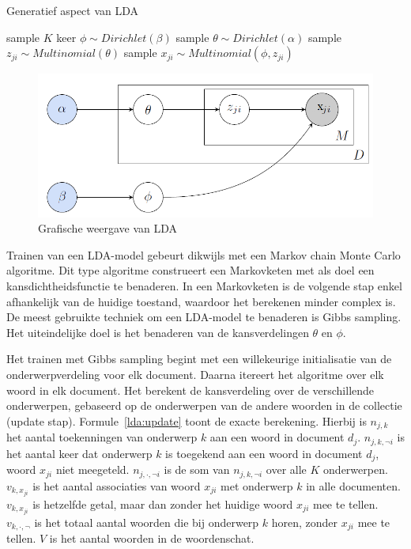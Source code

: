 \begin{algorithm}
\caption{Generatief aspect van LDA}
\begin{algorithmic} 
\STATE sample $K$ keer  $\phi \sim Dirichlet(\beta)$
\STATE sample $\theta \sim Dirichlet(\alpha)$
\STATE sample $z_{ji} \sim Multinomial(\theta)$
\STATE sample $x_{ji} \sim Multinomial(\phi,z_{ji})$
\ENDFOR
\ENDFOR
\end{algorithmic}
\label{algo:lda}
\end{algorithm}
                                  
\begin{figure}[tb]
    \centering
    \includegraphics[width=\linewidth]{Images/lda.png}
    \caption[Grafische weergave van LDA]{Grafische weergave van LDA~\cite{LDAsien}}
    \label{fig:lda}
\end{figure}

Trainen van een LDA-model gebeurt dikwijls met een Markov chain Monte Carlo algoritme. Dit type algoritme construeert een Markovketen met als doel een kansdichtheidsfunctie te benaderen. In een Markovketen is de volgende stap enkel afhankelijk van de huidige toestand, waardoor het berekenen minder complex is. De meest gebruikte techniek om een LDA-model te benaderen is Gibbs sampling. Het uiteindelijke doel is het benaderen van de kansverdelingen $\theta$ en $\phi$.

Het trainen met Gibbs sampling begint met een willekeurige initialisatie van de onderwerpverdeling voor elk document. Daarna itereert het algoritme over elk woord in elk document. Het berekent de kansverdeling over de verschillende onderwerpen, gebaseerd op de onderwerpen van de andere woorden in de collectie (update stap). Formule~\eqref{lda:update} toont de exacte berekening. Hierbij is $n_{j,k}$ het aantal toekenningen van onderwerp $k$ aan een woord in document $d_j$. $n_{j,k,\neg i}$ is het aantal keer dat onderwerp $k$ is toegekend aan een woord in document $d_j$, woord $x_{ji}$ niet meegeteld. $n_{j,\cdot,\neg i}$ is de som van $n_{j,k,\neg i}$ over alle $K$ onderwerpen. $v_{k,x_{ji}}$ is het aantal associaties van woord $x_{ji}$ met onderwerp $k$ in alle documenten. $v_{k,x_{ji}}$ is hetzelfde getal, maar dan zonder het huidige woord $x_{ji}$ mee te tellen. $v_{k,\cdot,\neg}$ is het totaal aantal woorden die bij onderwerp $k$ horen, zonder $x_{ji}$ mee te tellen. $V$ is het aantal woorden in de woordenschat.

